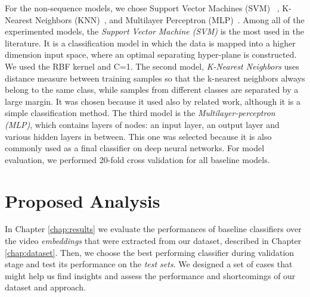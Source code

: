 For the non-sequence models, we chose Support Vector Machines (SVM)~\cite{cortes1995support} , K-Nearest Neighbors (KNN)~\cite{peterson2009k}, and Multilayer Perceptron (MLP)~\cite{haykin2009neural}.
Among all of the experimented models, the \textit{Support Vector Machine (SVM)} is the most used in the literature.
It is a classification model in which the data is mapped into a higher dimension input space, where an optimal separating hyper-plane is constructed. We used the RBF kernel and C=1.
The second model, \textit{K-Nearest Neighbors} uses distance measure between training samples so that the k-nearest neighbors always belong to the same class, while samples from different classes are separated by a large margin. 
It was chosen because it used also by related work, although it is a simple classification method.
The third model is the \textit{Multilayer-perceptron (MLP)}, which contains layers of nodes: an input layer, an output layer and various hidden layers in between. 
This one was selected because it is also commonly used as a final classifier on deep neural networks.  
For model evaluation, we performed 20-fold cross validation for all baseline models.
%
\section{Proposed Analysis}\label{sec:experiments}

In Chapter \ref{chap:results} we evaluate the performances of baseline classifiers over the video \textit{embeddings} that were extracted from our dataset, described in Chapter \ref{chap:dataset}. Then, we choose the best performing classifier during validation stage and test its performance on the \textit{test sets}.  
We designed a set of cases that might help us find insights and assess the performance and shortcomings of our dataset and approach.  

